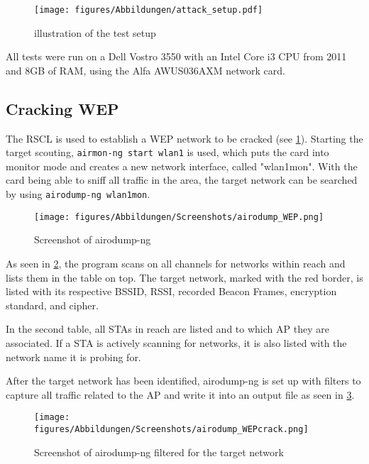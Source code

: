 \begin{figure}[h]
    \centering
    \texttt{[image: figures/Abbildungen/attack\_setup.pdf]}
    \caption{illustration of the test setup}
    \label{fig:test_setup}
\end{figure}

All tests were run on a Dell Vostro 3550 with an Intel Core i3 CPU from 2011 and 8GB of RAM, using the Alfa AWUS036AXM network card.

\subsection{Cracking WEP}{\label{ssec:method_WEP}}
The RSCL is used to establish a WEP network to be cracked (see \cref{fig:test_setup}).
Starting the target scouting, \lstinline[]|airmon-ng start wlan1| is used, which puts the card into monitor mode and creates a new network interface, called "wlan1mon".
With the card being able to sniff all traffic in the area, the target network can be searched by using \lstinline[]|airodump-ng wlan1mon|.

\begin{figure}[h]
    \centering
    \texttt{[image: figures/Abbildungen/Screenshots/airodump\_WEP.png]}
    \caption{Screenshot of airodump-ng}
    \label{fig:airodump-ng}
\end{figure}

As seen in \cref{fig:airodump-ng}, the program scans on all channels for networks within reach and lists them in the table on top.
The target network, marked with the red border, is listed with its respective BSSID, RSSI, recorded Beacon Frames, encryption standard, and cipher.

In the second table, all STAs in reach are listed and to which AP they are associated.
If a STA is actively scanning for networks, it is also listed with the network name it is probing for.

After the target network has been identified, airodump-ng is set up with filters to capture all traffic related to the AP and write it into an output file as seen in \cref{fig:airodump-ng_target}.

\begin{figure}[h]
    \centering
    \texttt{[image: figures/Abbildungen/Screenshots/airodump\_WEPcrack.png]}
    \caption{Screenshot of airodump-ng filtered for the target network}
    \label{fig:airodump-ng_target}
\end{figure}

